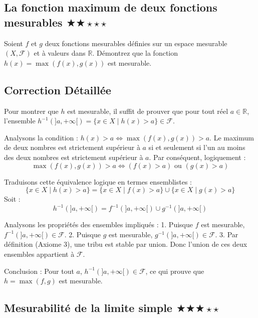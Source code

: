 \documentclass[11pt,a4paper]{article}
\begin{document}
\vspace{0.5cm}

\subsection*{La fonction maximum de deux fonctions mesurables \quad $\bigstar\bigstar\star\star\star$}

Soient $f$ et $g$ deux fonctions mesurables définies sur un espace mesurable $(X, \mathcal{F})$ et à valeurs dans $\mathbb{R}$.
Démontrez que la fonction $h(x) = \max(f(x), g(x))$ est mesurable.

\subsection*{Correction Détaillée}

Pour montrer que $h$ est mesurable, il suffit de prouver que pour tout réel $a \in \mathbb{R}$, l'ensemble $h^{-1}(]a, +\infty[) = \{x \in X \mid h(x) > a\} \in \mathcal{F}$.

Analysons la condition : $h(x) > a \iff \max(f(x), g(x)) > a$.
Le maximum de deux nombres est strictement supérieur à $a$ si et seulement si l'un au moins des deux nombres est strictement supérieur à $a$.
Par conséquent, logiquement :
$$ \max(f(x), g(x)) > a \iff (f(x) > a) \text{ ou } (g(x) > a) $$

Traduisons cette équivalence logique en termes ensemblistes :
$$ \{x \in X \mid h(x) > a\} = \{x \in X \mid f(x) > a\} \cup \{x \in X \mid g(x) > a\} $$
Soit :
$$ h^{-1}(]a, +\infty[) = f^{-1}(]a, +\infty[) \cup g^{-1}(]a, +\infty[) $$

Analysons les propriétés des ensembles impliqués :
1. Puisque $f$ est mesurable, $f^{-1}(]a, +\infty[) \in \mathcal{F}$.
2. Puisque $g$ est mesurable, $g^{-1}(]a, +\infty[) \in \mathcal{F}$.
3. Par définition (Axiome 3), une tribu est stable par union. Donc l'union de ces deux ensembles appartient à $\mathcal{F}$.

Conclusion : Pour tout $a$, $h^{-1}(]a, +\infty[) \in \mathcal{F}$, ce qui prouve que $h = \max(f, g)$ est mesurable.


\vspace{0.5cm}

\subsection*{Mesurabilité de la limite simple \quad $\bigstar\bigstar\bigstar\star\star$}
\end{document}
